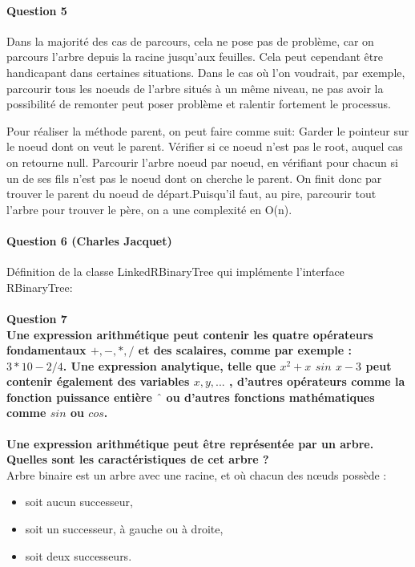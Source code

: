 \documentclass[a4paper]{article}
\begin{document}
\paragraph{Question 5}

Dans la majorité des cas de parcours, cela ne pose pas de problème, car on parcours l'arbre depuis la racine jusqu'aux feuilles. Cela peut cependant être handicapant dans certaines situations. Dans le cas où l'on voudrait, par exemple, parcourir tous les noeuds de l'arbre situés à un même niveau, ne pas avoir la possibilité de remonter peut poser problème et ralentir fortement le processus.

Pour réaliser la méthode parent, on peut faire comme suit: Garder le pointeur sur le noeud dont on veut le parent.
Vérifier si ce noeud n'est pas le root, auquel cas on retourne null.
Parcourir l'arbre noeud par noeud, en vérifiant pour chacun si un de ses fils n'est pas le noeud dont on cherche le parent. 
On finit donc par trouver le parent du noeud de départ.Puisqu'il faut, au pire, parcourir tout l'arbre pour trouver le père, on a une complexité en O(n).

\paragraph{Question 6 (Charles Jacquet)}


Définition de la classe LinkedRBinaryTree qui implémente l'interface RBinaryTree:



\paragraph{Question 7\\	Une expression arithmétique peut contenir les quatre opérateurs fondamentaux
	$ +,-,*,/ $ et des scalaires, comme par exemple : $ 3 * 10 - 2/4 $. Une expression
	analytique, telle que $ x^{2}+x$ $ sin $ $ x-3 $ peut contenir également des variables $ x,y,... $ ,
	d’autres opérateurs comme la fonction puissance entière $ ˆ $ ou d’autres fonctions
	mathématiques comme $ sin $ ou $ cos $.\\}

	\textbf{
	Une expression arithmétique peut être représentée par un arbre.
	Quelles sont les caractéristiques de cet arbre ?\\}
Arbre binaire est un arbre avec une racine, et où chacun des nœuds possède : 
\begin{itemize}
	\item soit aucun successeur, 
	\item soit un successeur, à gauche ou à droite, 
	\item soit deux successeurs. 
\end{itemize}
\end{document}
